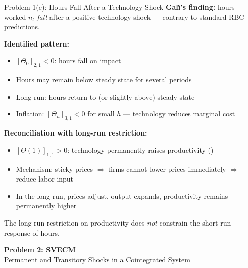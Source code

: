 \documentclass[aspectratio=169,11pt]{beamer}
\begin{document}
\begin{frame}{Problem 1(e): Hours Fall After a Technology Shock}
    \textbf{Gal\'{\i}'s finding:} hours worked $n_t$ \textit{fall} after a positive technology shock --- contrary to standard RBC predictions.

    \vspace{0.3em}
    \textbf{Identified pattern:}
    \begin{itemize}
        \item $[\Theta_0]_{2,1} < 0$: hours fall on impact
        \item Hours may remain below steady state for several periods
        \item Long run: hours return to (or slightly above) steady state
        \item Inflation: $[\Theta_h]_{3,1} < 0$ for small $h$ --- technology reduces marginal cost
    \end{itemize}

    \vspace{0.3em}
    \textbf{Reconciliation with long-run restriction:}
    \begin{itemize}
        \item $[\Theta(1)]_{1,1} > 0$: technology permanently raises productivity (\checkmark)
        \item Mechanism: sticky prices $\Rightarrow$ firms cannot lower prices immediately $\Rightarrow$ reduce labor input
        \item In the long run, prices adjust, output expands, productivity remains permanently higher
    \end{itemize}
    \textcolor{mitred}{The long-run restriction on productivity does \textit{not} constrain the short-run response of hours.}
\end{frame}

\begin{frame}[plain]
    \begin{center}
        {\Large \textbf{Problem 2: SVECM}}\\[1em]
        {\large Permanent and Transitory Shocks in a Cointegrated System}
    \end{center}
\end{frame}
\end{document}
